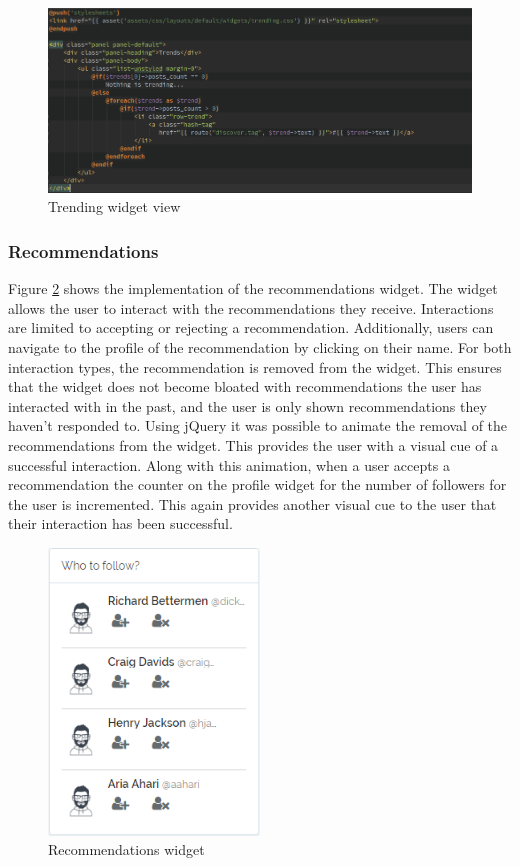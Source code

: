 \begin{figure}[H]
	\centering
	\includegraphics[width=\textwidth]{Images/Implementation/UI/Widgets/trending-blade}
	\caption{Trending widget view}
	\label{fig:trending-blade}
\end{figure}

\subsubsection{Recommendations}
Figure \ref{fig:RecommendationsWidget} shows the implementation of the recommendations widget. The widget allows the user to interact with the recommendations they receive. Interactions are limited to accepting or rejecting a recommendation. Additionally, users can navigate to the profile of the recommendation by clicking on their name. For both interaction types, the recommendation is removed from the widget. This ensures that the widget does not become bloated with recommendations the user has interacted with in the past, and the user is only shown recommendations they haven't responded to. Using jQuery it was possible to animate the removal of the recommendations from the widget. This provides the user with a visual cue of a successful interaction. Along with this animation, when a user accepts a recommendation the counter on the profile widget for the number of followers for the user is incremented. This again provides another visual cue to the user that their  interaction has been successful.

\begin{figure}[H]
\centering
\includegraphics[height=3in]{Images/Implementation/RecommendationsWidget}
\caption{Recommendations widget}
\label{fig:RecommendationsWidget}
\end{figure}


